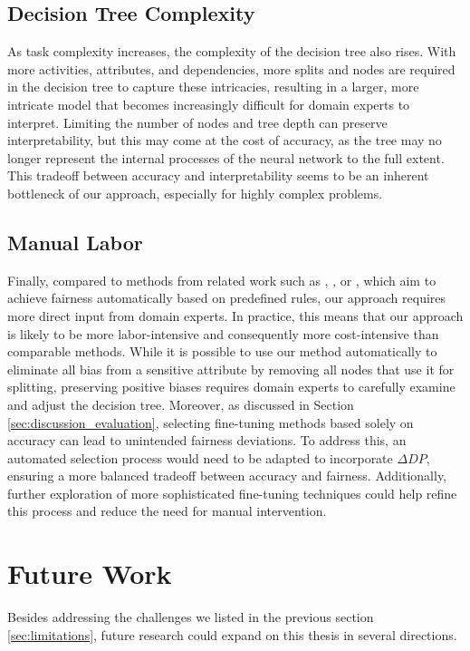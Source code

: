 \subsection*{Decision Tree Complexity}
As task complexity increases, the complexity of the decision tree also rises.
With more activities, attributes, and dependencies, 
more splits and nodes are required in the decision tree to capture these intricacies, 
resulting in a larger, more intricate model that becomes increasingly difficult for domain experts to interpret.
Limiting the number of nodes and tree depth can preserve interpretability, 
but this may come at the cost of accuracy, 
as the tree may no longer represent the internal processes of the neural network to the full extent.
This tradeoff between accuracy and interpretability seems to be an inherent bottleneck of our approach, 
especially for highly complex problems.

\subsection*{Manual Labor}
Finally, compared to methods from related work such as \cite{fairness_foundation}, \cite{fairness_adversarial}, 
or \cite{fairness_independence}, which aim to achieve fairness automatically based on predefined rules, 
our approach requires more direct input from domain experts.
In practice, this means that our approach is likely to be more labor-intensive
and consequently more cost-intensive than comparable methods.
While it is possible to use our method automatically to eliminate all bias from a sensitive attribute
by removing all nodes that use it for splitting, 
preserving positive biases requires domain experts to carefully examine and adjust the decision tree.
Moreover, as discussed in Section \ref{sec:discussion_evaluation},
selecting fine-tuning methods based solely on accuracy can lead to unintended fairness deviations.
To address this, an automated selection process would need to be adapted to incorporate $\Delta \textit{DP}$,
ensuring a more balanced tradeoff between accuracy and fairness.
Additionally, further exploration of more sophisticated fine-tuning techniques could help refine this process and reduce the need for manual intervention.


\section{Future Work}
Besides addressing the challenges we listed in the previous section \ref{sec:limitations},
future research could expand on this thesis in several directions.

